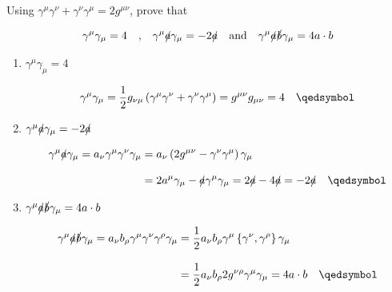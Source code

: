 \begin{problem}{6.8}
    Using $\gamma^\mu\gamma^\nu + \gamma^\nu\gamma^\mu = 2g^{\mu\nu}$, prove that 

    \begin{align*}
        \gamma^\mu\gamma_\mu =4 \quad \text{,} \quad \gamma^\mu \slashed{a}  \gamma_\mu = - 2 \slashed{a} \quad \text{and} \quad \gamma^\mu \slashed{a} \slashed{b} \gamma_\mu = 4 a\cdot b \\
    \end{align*}
\end{problem}
\begin{solution}
    \begin{enumerate}[label=(\alph*)]
        \item $\gamma^\mu\gamma_\mu =4$
        
            \begin{align*}
                \gamma^\mu\gamma_\mu = \frac{1}{2}g_{\nu\mu} \left(\gamma^\mu\gamma^\nu + \gamma^\nu\gamma^\mu\right) = g^{\mu\nu} g_{\mu\nu} = 4 \qed
            \end{align*}

        \item $ \gamma^\mu \slashed{a}  \gamma_\mu = - 2 \slashed{a}$
        
            \begin{align*}
                \gamma^\mu \slashed{a}  \gamma_\mu = a_\nu \gamma^\mu \gamma^\nu  \gamma_\mu &= a_\nu \left( 2g^{\mu\nu} - \gamma^\nu\gamma^\mu \right)\gamma_\mu  \\[0.12in]
                &= 2a^\mu\gamma_\mu - \slashed{a} \gamma^\mu\gamma_\mu = 2\slashed{a} - 4\slashed{a} = -2 \slashed{a} \qed 
            \end{align*}

        \item $\gamma^\mu \slashed{a} \slashed{b} \gamma_\mu = 4 a\cdot b$
        
            \begin{align*}
                \gamma^\mu \slashed{a} \slashed{b} \gamma_\mu = a_\nu b_\rho \gamma^\mu \gamma^\nu \gamma^\rho \gamma_\mu &= \frac{1}{2} a_\nu b_\rho \gamma^\mu \left\{ \gamma^\nu ,\gamma^\rho \right\} \gamma_\mu \\[0.12in]
                &= \frac{1}{2} a_\nu b_\rho 2 g^{\nu\rho} \gamma^\mu\gamma_\mu = 4 a\cdot b \qed 
            \end{align*}
    \end{enumerate}
\end{solution}

